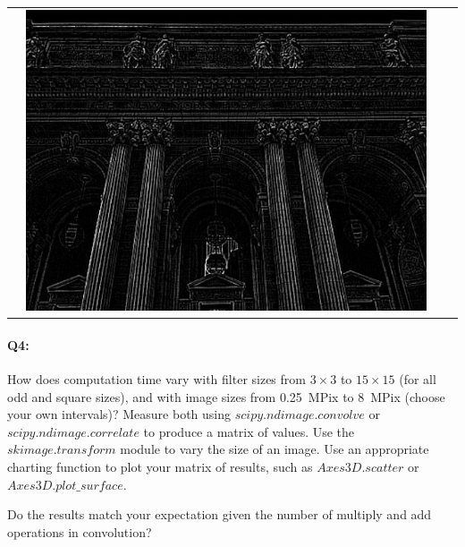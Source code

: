 \begin{table}[h!]
\begin{center}
\begin{tabular}{c c c c}
      & 
      \includegraphics[scale=0.4]{hpres.jpg}
      \end{tabular}
      \end{center}
      \end{table}






\pagebreak
\paragraph{Q4:} How does computation time vary with filter sizes from $3\times3$ to $15\times15$ (for all odd and square sizes), and with image sizes from 0.25~MPix to 8~MPix (choose your own intervals)? Measure both using \href{https://docs.scipy.org/doc/scipy/reference/generated/scipy.ndimage.convolve.html}{$scipy.ndimage.convolve$} or \href{https://docs.scipy.org/doc/scipy/reference/generated/scipy.ndimage.correlate.html}{$scipy.ndimage.correlate$} to produce a matrix of values. Use the \href{http://scikit-image.org/docs/dev/auto_examples/transform/plot_rescale.html}{$skimage.transform$} module to vary the size of an image. Use an appropriate charting function to plot your matrix of results, such as \href{https://matplotlib.org/tutorials/toolkits/mplot3d.html#scatter-plots}{$Axes3D.scatter$} or \href{https://matplotlib.org/tutorials/toolkits/mplot3d.html#surface-plots}{$Axes3D.plot\textrm{\_}surface$}.

Do the results match your expectation given the number of multiply and add operations in convolution?

